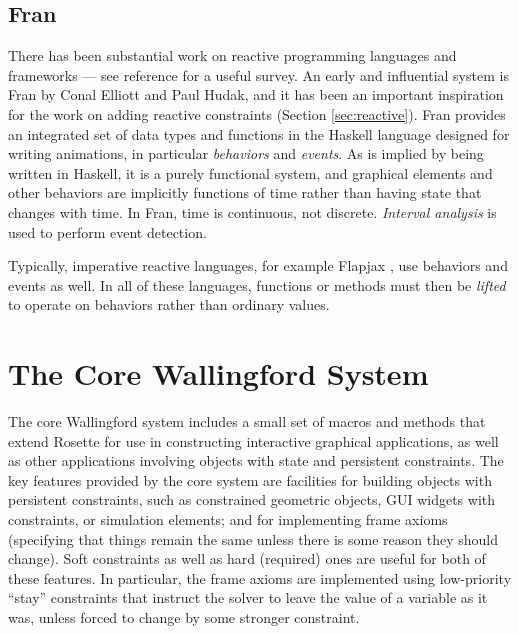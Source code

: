 \documentclass[reprint]{sigplanconf}
\begin{document}
\subsection{Fran}
\label{sec:fran}

There has been substantial work on reactive programming languages and
frameworks --- see reference
\cite{bainomugisha-computing-surveys-2012} for a useful survey.  An
early and influential system is Fran by Conal Elliott and Paul Hudak,
and it has been an important inspiration for the work on adding
reactive constraints (Section \ref{sec:reactive}).  Fran provides an
integrated set of data types and functions in the Haskell language
designed for writing animations, in particular \emph{behaviors} and
\emph{events}.  As is implied by being written in Haskell, it is a
purely functional system, and graphical elements and other behaviors
are implicitly functions of time rather than having state that changes
with time.  In Fran, time is continuous, not discrete.  \emph{Interval
  analysis} \cite{snyder-siggraph-1992} is used to perform event
detection.

Typically, imperative reactive languages, for example Flapjax
\cite{meyerovich-oopsla-2009}, use behaviors and events as well.  In
all of these languages, functions or methods must then be
\emph{lifted} to operate on behaviors rather than ordinary values.

\section{The Core Wallingford System}
\label{sec:core-wallingford}

The core Wallingford system includes a small set of macros and methods
that extend Rosette for use in constructing interactive graphical
applications, as well as other applications involving objects with
state and persistent constraints.  The key features provided by the
core system are facilities for building objects with persistent
constraints, such as constrained geometric objects, GUI widgets with
constraints, or simulation elements; and for implementing frame axioms
(specifying that things remain the same unless there is some reason
they should change).  Soft constraints as well as hard (required) ones
are useful for both of these features.  In particular, the frame
axioms are implemented using low-priority ``stay'' constraints that
instruct the solver to leave the value of a variable as it was, unless
forced to change by some stronger constraint.
\end{document}
